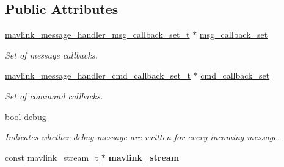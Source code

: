 \subsection*{Public Attributes}
\begin{DoxyCompactItemize}
\item 
\hypertarget{structmavlink__message__handler__t_aa47aa49e599357b06f6ab1d4de287d6f}{\hyperlink{structmavlink__message__handler__msg__callback__set__t}{mavlink\+\_\+message\+\_\+handler\+\_\+msg\+\_\+callback\+\_\+set\+\_\+t} $\ast$ \hyperlink{structmavlink__message__handler__t_aa47aa49e599357b06f6ab1d4de287d6f}{msg\+\_\+callback\+\_\+set}}\label{structmavlink__message__handler__t_aa47aa49e599357b06f6ab1d4de287d6f}

\begin{DoxyCompactList}\small\item\em Set of message callbacks. \end{DoxyCompactList}\item 
\hypertarget{structmavlink__message__handler__t_a4d0037820949eb6456e1ea035035d478}{\hyperlink{structmavlink__message__handler__cmd__callback__set__t}{mavlink\+\_\+message\+\_\+handler\+\_\+cmd\+\_\+callback\+\_\+set\+\_\+t} $\ast$ \hyperlink{structmavlink__message__handler__t_a4d0037820949eb6456e1ea035035d478}{cmd\+\_\+callback\+\_\+set}}\label{structmavlink__message__handler__t_a4d0037820949eb6456e1ea035035d478}

\begin{DoxyCompactList}\small\item\em Set of command callbacks. \end{DoxyCompactList}\item 
\hypertarget{structmavlink__message__handler__t_aff84e135d82fb5155268df3730addcba}{bool \hyperlink{structmavlink__message__handler__t_aff84e135d82fb5155268df3730addcba}{debug}}\label{structmavlink__message__handler__t_aff84e135d82fb5155268df3730addcba}

\begin{DoxyCompactList}\small\item\em Indicates whether debug message are written for every incoming message. \end{DoxyCompactList}\item 
\hypertarget{structmavlink__message__handler__t_a2c330dcf4d26c17c0312c1db4c602cf8}{const \hyperlink{structmavlink__stream__t}{mavlink\+\_\+stream\+\_\+t} $\ast$ {\bfseries mavlink\+\_\+stream}}\label{structmavlink__message__handler__t_a2c330dcf4d26c17c0312c1db4c602cf8}

\end{DoxyCompactItemize}


